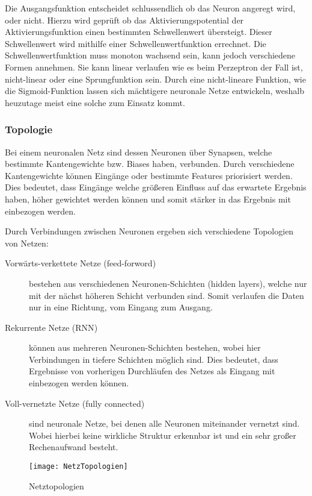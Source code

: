     \noindent
    Die Ausgangsfunktion entscheidet schlussendlich ob das Neuron angeregt wird, oder nicht.
    Hierzu wird geprüft ob das Aktivierungspotential der Aktivierungsfunktion einen bestimmten Schwellenwert übersteigt.
    Dieser Schwellenwert wird mithilfe einer Schwellenwertfunktion errechnet. 
    Die Schwellenwertfunktion muss monoton wachsend sein, kann jedoch verschiedene Formen annehmen. 
    Sie kann linear verlaufen wie es beim Perzeptron der Fall ist, nicht-linear oder eine Sprungfunktion sein. 
    Durch eine nicht-lineare Funktion, wie die Sigmoid-Funktion lassen sich mächtigere neuronale Netze entwickeln, weshalb heuzutage meist eine solche zum Einsatz kommt.


    \subsubsection{Topologie}
    Bei einem neuronalen Netz sind dessen Neuronen über Synapsen, welche bestimmte Kantengewichte bzw. Biases haben, verbunden.
    Durch verschiedene Kantengewichte können Eingänge oder bestimmte Features priorisiert werden. 
    Dies bedeutet, dass Eingänge welche größeren Einfluss auf das erwartete Ergebnis haben, höher gewichtet werden können und somit stärker in das Ergebnis mit einbezogen werden.
    \newline

    \noindent
    Durch Verbindungen zwischen Neuronen ergeben sich verschiedene Topologien von Netzen:
    \begin{description}
        \item[Vorwärts-verkettete Netze (feed-forword)] bestehen aus verschiedenen Neuronen-Schichten (hidden layers), welche nur mit der nächst höheren Schicht verbunden sind. Somit verlaufen die Daten nur in eine Richtung, vom Eingang zum Ausgang.
        \item[Rekurrente Netze (\ac{RNN})] können aus mehreren Neuronen-Schichten bestehen, wobei hier Verbindungen in tiefere Schichten möglich sind. Dies bedeutet, dass Ergebnisse von vorherigen Durchläufen des Netzes als Eingang mit einbezogen werden können.
        \item[Voll-vernetzte Netze (fully connected)] sind neuronale Netze, bei denen alle Neuronen miteinander vernetzt sind. Wobei hierbei keine wirkliche Struktur erkennbar ist und ein sehr großer Rechenaufwand besteht.
    \end{description}

    \begin{figure}[H]
        \centering
        \texttt{[image: NetzTopologien]}
        \caption{Netztopologien \cite{DrawIO}}
        \label{fig:NetzTopologien}
    \end{figure}



